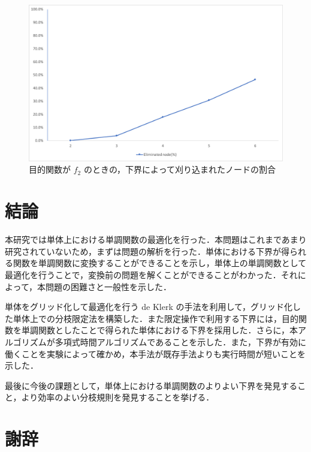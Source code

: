 \documentclass[a4paper,11pt]{jreport}
\begin{document}
\begin{figure}[h]
\begin{center}
\includegraphics[width=14cm]{graphs/f_2_eliminated}
\caption{目的関数が $ f_2 $ のときの，下界によって刈り込まれたノードの割合}
\label{fig:f_2_eliminated}
\end{center}
\end{figure}

\chapter{結論}

本研究では単体上における単調関数の最適化を行った．本問題はこれまであまり研究されていないため，まずは問題の解析を行った．単体における下界が得られる関数を単調関数に変換することができることを示し，単体上の単調関数として最適化を行うことで，変換前の問題を解くことができることがわかった．それによって，本問題の困難さと一般性を示した．\par
単体をグリッド化して最適化を行う de Klerk の手法を利用して，グリッド化した単体上での分枝限定法を構築した．また限定操作で利用する下界には，目的関数を単調関数としたことで得られた単体における下界を採用した．さらに，本アルゴリズムが多項式時間アルゴリズムであることを示した．また，下界が有効に働くことを実験によって確かめ，本手法が既存手法よりも実行時間が短いことを示した．\par
最後に今後の課題として，単体上における単調関数のよりよい下界を発見すること，より効率のよい分枝規則を発見することを挙げる．\par

\chapter*{謝辞}
\end{document}
